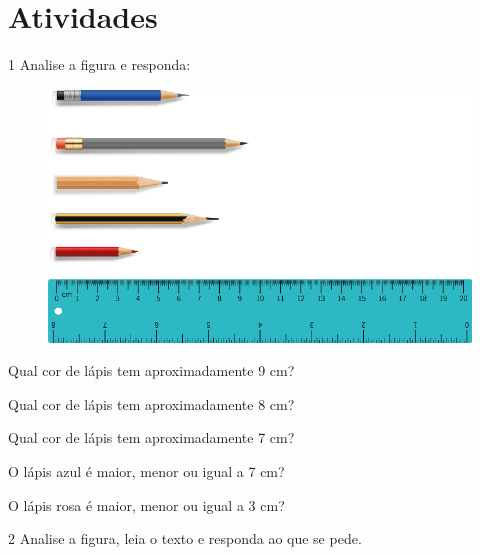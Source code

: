 \pagebreak
\section*{Atividades}

\num{1} Analise a figura e responda:

\begin{figure}[htpb!]
\includegraphics[width=.9\textwidth]{./media/image30.png}
\end{figure}

\begin{escolha}[itemsep=-5pt]
\item  Qual cor de lápis tem aproximadamente 9 cm?

\item  Qual cor de lápis tem aproximadamente 8 cm?

\item  Qual cor de lápis tem aproximadamente 7 cm?

\item  O lápis azul é maior, menor ou igual a 7 cm?

\item  O lápis rosa é maior, menor ou igual a 3 cm?
\end{escolha}

\pagebreak
\num{2} Analise a figura, leia o texto e responda ao que se pede.


